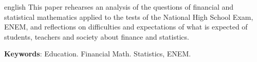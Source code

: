 
\begin{resumo}[Abstract]
 \begin{otherlanguage*}{english}
    This paper rehearses an analysis of the questions of financial and statistical mathematics applied to the tests of the National High School Exam, ENEM, and reflections on difficulties and expectations of what is expected of students, teachers and society about finance and statistics.
 
   \vspace{\onelineskip}
   
   \textbf{Keywords}: Education. Financial Math. Statistics, ENEM.
   
 \end{otherlanguage*}
\end{resumo}
